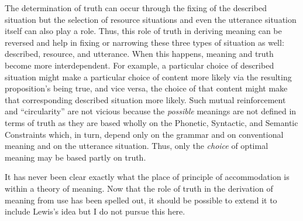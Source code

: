 The determination of truth can occur through the fixing of the described situation but the selection of resource situations and even the utterance situation itself can also play a role. Thus, this role of truth in deriving meaning can be reversed and help in fixing or narrowing these three types of situation as well: described, resource, and utterance. When this happens, meaning and truth become more interdependent. For example, a particular choice of described situation might make a particular choice of content more likely via the resulting proposition's being true, and vice versa, the choice of that content might make that corresponding described situation more likely. Such mutual reinforcement and ``circularity'' are not vicious because the \emph{possible} meanings are not defined in terms of truth as they are based wholly on the Phonetic, Syntactic, and Semantic Constraints which, in turn, depend only on the grammar and on conventional meaning and on the utterance situation. Thus, only the \emph{choice} of optimal meaning may be based partly on truth.

It has never been clear exactly what the place of  principle of accommodation  is within a theory of meaning. Now that the role of truth in the derivation of meaning from use has been spelled out, it should be possible to extend it to include Lewis's idea but I do not pursue this here.
